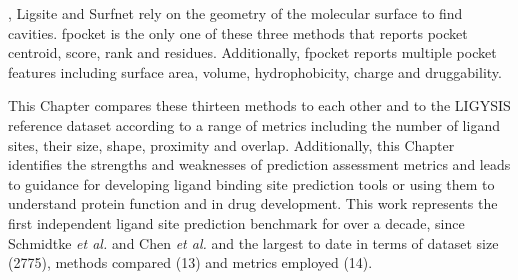 \cite{GUILLOUX_2009_FPOCKET}, Ligsite \cite{HENDLICH_1997_LIGSITE} and Surfnet \cite{LASKOWSKI_1995_SURFNET} rely on the geometry of the molecular surface to find cavities. fpocket is the only one of these three methods that reports pocket centroid, score, rank and residues. Additionally, fpocket reports multiple pocket features including surface area, volume, hydrophobicity, charge and druggability. 

This Chapter compares these thirteen methods to each other and to the LIGYSIS reference dataset according to a range of metrics including the number of ligand sites, their size, shape, proximity and overlap. Additionally, this Chapter identifies the strengths and weaknesses of prediction assessment metrics and leads to guidance for developing ligand binding site prediction tools or using them to understand protein function and in drug development. This work represents the first independent ligand site prediction benchmark for over a decade, since Schmidtke \textit{et al.} \cite{SCHMIDTKE_2010_BENCHMARK} and Chen \textit{et al.} \cite{CHEN_2011_ASSESSMENT} and the largest to date in terms of dataset size (2775), methods compared (13) and metrics employed (14).

